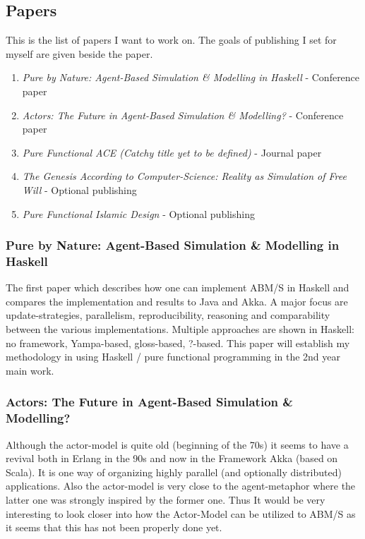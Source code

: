 \subsection{Papers}
This is the list of papers I want to work on. The goals of publishing I set for myself are given beside the paper.

\begin{enumerate}
\item \textit{Pure by Nature: Agent-Based Simulation \& Modelling in Haskell} - Conference paper
\item \textit{Actors: The Future in Agent-Based Simulation \& Modelling?} - Conference paper
\item \textit{Pure Functional ACE (Catchy title yet to be defined)} - Journal paper
\item \textit{The Genesis According to Computer-Science: Reality as Simulation of Free Will} - Optional publishing
\item \textit{Pure Functional Islamic Design} - Optional publishing
\end{enumerate}

\subsubsection{Pure by Nature: Agent-Based Simulation \& Modelling in Haskell}
The first paper which describes how one can implement ABM/S in Haskell and compares the implementation and results to Java and Akka. A major focus are update-strategies, parallelism, reproducibility, reasoning and comparability between the various implementations. Multiple approaches are shown in Haskell: no framework, Yampa-based, gloss-based, ?-based. This paper will establish my methodology in using Haskell / pure functional programming in the 2nd year main work.

\subsubsection{Actors: The Future in Agent-Based Simulation \& Modelling?}
Although the actor-model is quite old (beginning of the 70s) it seems to have a revival both in Erlang in the 90s and now in the Framework Akka (based on Scala). It is one way of organizing highly parallel (and optionally distributed) applications. Also the actor-model is very close to the agent-metaphor where the latter one was strongly inspired by the former one. Thus It would be very interesting to look closer into how the Actor-Model can be utilized to ABM/S as it seems that this has not been properly done yet.

